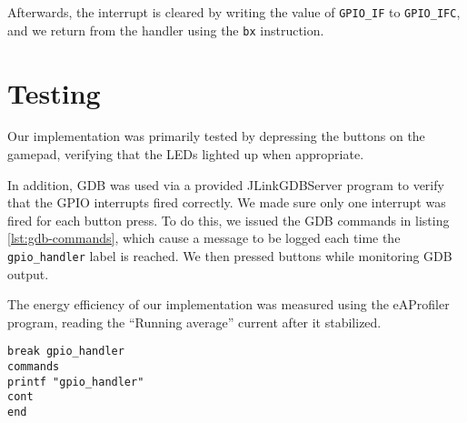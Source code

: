 Afterwards, the interrupt is cleared by writing the value of \texttt{GPIO\_IF} to \texttt{GPIO\_IFC}, and we return from the handler using the \texttt{bx} instruction.

\section{Testing}
\label{sec:testing}

Our implementation was primarily tested by depressing the buttons on the gamepad, verifying that the LEDs lighted up when appropriate.

In addition, GDB was used via a provided JLinkGDBServer program to verify that the GPIO interrupts fired correctly. We made sure only one interrupt was fired for each button press. To do this, we issued the GDB commands in listing \ref{lst:gdb-commands}, which cause a message to be logged each time the \texttt{gpio\_handler} label is reached. We then pressed buttons while monitoring GDB output.

The energy efficiency of our implementation was measured using the eAProfiler program, reading the ``Running average'' current after it stabilized.

\begin{lstlisting}[label=lst:gdb-commands, caption=Setting a breakpoint at the GPIO exception handler]
break gpio_handler
commands
printf "gpio_handler"
cont
end
\end{lstlisting}